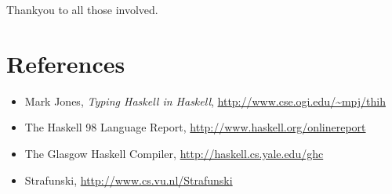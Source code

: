\documentclass{article}
\begin{document}
Thankyou to all those involved.

\section{References}

\begin{itemize}
\item Mark Jones, \emph{Typing Haskell in Haskell}, \url{http://www.cse.ogi.edu/~mpj/thih}
\item The Haskell 98 Language Report, \url{http://www.haskell.org/onlinereport}
\item The Glasgow Haskell Compiler, \url{http://haskell.cs.yale.edu/ghc}
\item Strafunski, \url{http://www.cs.vu.nl/Strafunski}
\end{itemize}
\end{document}
